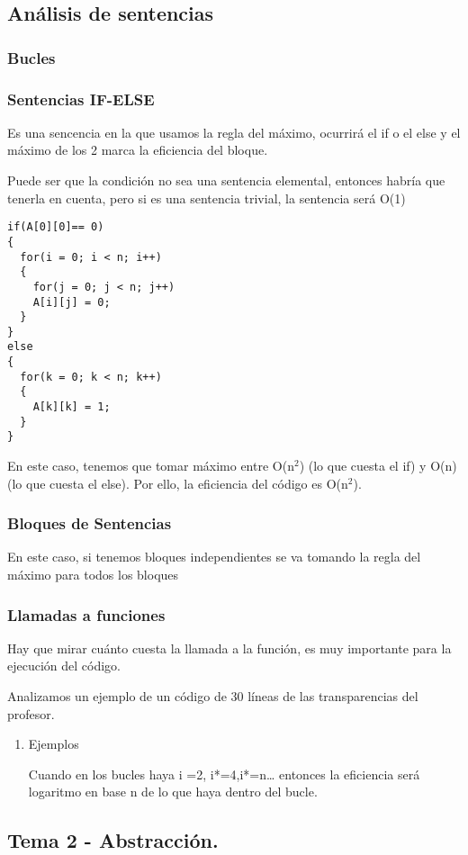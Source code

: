 \documentclass[11pt]{article}
\begin{document}
\subsection{Análisis de sentencias}
\label{sec-1-2}

\subsubsection{Bucles}
\label{sec-1-2-1}


\subsubsection{Sentencias IF-ELSE}
\label{sec-1-2-2}

Es una sencencia en la que usamos la regla del máximo, ocurrirá el if o el else y el máximo de los 2 marca la eficiencia del bloque.

Puede ser que la condición no sea una sentencia elemental, entonces habría que tenerla en cuenta, pero si es una sentencia trivial, la sentencia será O(1)


\begin{verbatim}
if(A[0][0]== 0)
{
  for(i = 0; i < n; i++)
  {
    for(j = 0; j < n; j++)
    A[i][j] = 0;
  }
}
else
{
  for(k = 0; k < n; k++)
  {
    A[k][k] = 1;
  }
}
\end{verbatim}


En este caso, tenemos que tomar máximo entre O(n$^{\text{2}}$) (lo que cuesta el if) y O(n)(lo que cuesta el else). Por ello, la eficiencia del código es O(n$^{\text{2}}$).

\subsubsection{Bloques de Sentencias}
\label{sec-1-2-3}
En este caso, si tenemos bloques independientes se va tomando la regla del máximo para todos los bloques

\subsubsection{Llamadas a funciones}
\label{sec-1-2-4}

Hay que mirar cuánto cuesta la llamada a la función, es muy importante para la ejecución del código.

Analizamos un ejemplo de un código de 30 líneas de las transparencias del profesor.


\begin{enumerate}
\item Ejemplos
\label{sec-1-2-4-1}

Cuando en los bucles haya i  =2, i*=4,i*=n\ldots{} entonces la eficiencia será logaritmo en base n de lo que haya dentro del bucle.
\end{enumerate}

\subsection{Tema 2 - Abstracción.}
\label{sec-1-3}
\end{document}
